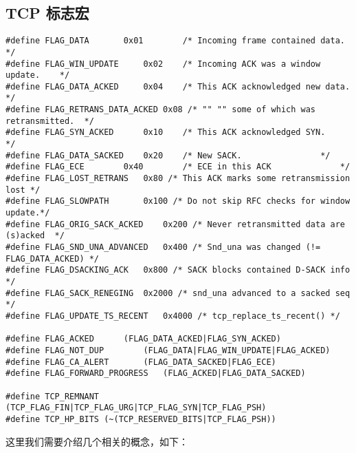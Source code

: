    \subsection{TCP 标志宏}
        \label{TCPFlag}
\begin{verbatim}
#define FLAG_DATA       0x01        /* Incoming frame contained data.       */
#define FLAG_WIN_UPDATE     0x02    /* Incoming ACK was a window update.    */
#define FLAG_DATA_ACKED     0x04    /* This ACK acknowledged new data.      */
#define FLAG_RETRANS_DATA_ACKED 0x08 /* "" "" some of which was retransmitted.  */
#define FLAG_SYN_ACKED      0x10    /* This ACK acknowledged SYN.       */
#define FLAG_DATA_SACKED    0x20    /* New SACK.                */
#define FLAG_ECE        0x40        /* ECE in this ACK              */
#define FLAG_LOST_RETRANS   0x80 /* This ACK marks some retransmission lost */
#define FLAG_SLOWPATH       0x100 /* Do not skip RFC checks for window update.*/
#define FLAG_ORIG_SACK_ACKED    0x200 /* Never retransmitted data are (s)acked  */
#define FLAG_SND_UNA_ADVANCED   0x400 /* Snd_una was changed (!= FLAG_DATA_ACKED) */
#define FLAG_DSACKING_ACK   0x800 /* SACK blocks contained D-SACK info */
#define FLAG_SACK_RENEGING  0x2000 /* snd_una advanced to a sacked seq */
#define FLAG_UPDATE_TS_RECENT   0x4000 /* tcp_replace_ts_recent() */

#define FLAG_ACKED      (FLAG_DATA_ACKED|FLAG_SYN_ACKED)
#define FLAG_NOT_DUP        (FLAG_DATA|FLAG_WIN_UPDATE|FLAG_ACKED)
#define FLAG_CA_ALERT       (FLAG_DATA_SACKED|FLAG_ECE)
#define FLAG_FORWARD_PROGRESS   (FLAG_ACKED|FLAG_DATA_SACKED)

#define TCP_REMNANT (TCP_FLAG_FIN|TCP_FLAG_URG|TCP_FLAG_SYN|TCP_FLAG_PSH)
#define TCP_HP_BITS (~(TCP_RESERVED_BITS|TCP_FLAG_PSH))
\end{verbatim}

            这里我们需要介绍几个相关的概念，如下：

